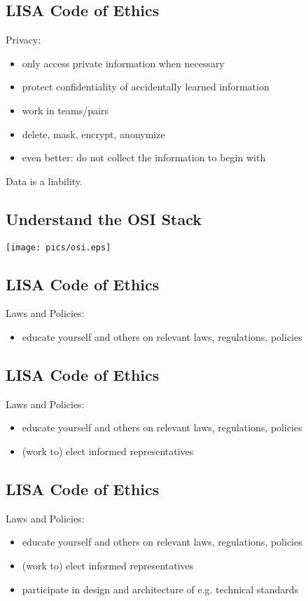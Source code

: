 \documentclass[xga]{xdvislides}
\begin{document}
\subsection{LISA Code of Ethics}
Privacy:
\begin{itemize}
	\item only access private information when necessary
	\item protect confidentiality of accidentally learned information
	\item work in teams/pairs
	\item delete, mask, encrypt, anonymize
	\item even better: do not collect the information to begin with
\end{itemize}
\vspace{.5in}
Data is a liability.

\subsection{Understand the OSI Stack}
\vspace*{\fill}
\begin{center}
	\texttt{[image: pics/osi.eps]}
\end{center}
\vspace*{\fill}

\subsection{LISA Code of Ethics}
Laws and Policies:
\begin{itemize}
	\item educate yourself and others on relevant laws, regulations, policies
\end{itemize}

\subsection{LISA Code of Ethics}
Laws and Policies:
\begin{itemize}
	\item educate yourself and others on relevant laws, regulations, policies
	\item (work to) elect informed representatives
\end{itemize}

\subsection{LISA Code of Ethics}
Laws and Policies:
\begin{itemize}
	\item educate yourself and others on relevant laws, regulations, policies
	\item (work to) elect informed representatives
	\item participate in design and architecture of e.g. technical standards
\end{itemize}
\end{document}
